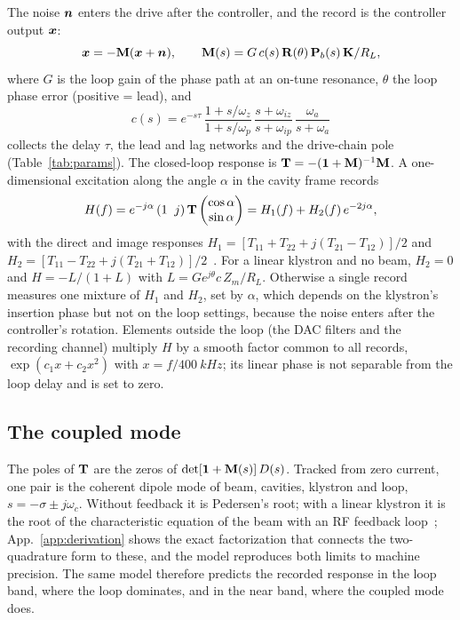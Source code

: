 The noise $\bm{n}$ enters the drive after the controller, and the record is the controller output $\bm{x}$:
\begin{equation}\label{eq:loop}
\bm{x}=-\mathbf{M}(\bm{x}+\bm{n}),\qquad \mathbf{M}(s)=G\,c(s)\,\mathbf{R}(\theta)\,\mathbf{P}_b(s)\,\mathbf{K}/R_L,
\end{equation}
where $G$ is the loop gain of the phase path at an on-tune resonance, $\theta$ the loop phase error (positive = lead), and
\begin{equation}\label{eq:chain}
c(s)=e^{-s\tau}\,\frac{1+s/\omega_z}{1+s/\omega_p}\,\frac{s+\omega_{iz}}{s+\omega_{ip}}\,\frac{\omega_a}{s+\omega_a}
\end{equation}
collects the delay $\tau$, the lead and lag networks and the drive-chain pole (Table~\ref{tab:params}). The closed-loop response is $\mathbf{T}=-(\mathbf{1}+\mathbf{M})^{-1}\mathbf{M}$. A one-dimensional excitation along the angle $\alpha$ in the cavity frame records
\begin{equation}\label{eq:recorded}
H(f)=e^{-j\alpha}\,(1\;\;j)\,\mathbf{T}\begin{pmatrix}\cos\alpha\\ \sin\alpha\end{pmatrix}=H_1(f)+H_2(f)\,e^{-2j\alpha},
\end{equation}
with the direct and image responses $H_1=[T_{11}+T_{22}+j(T_{21}-T_{12})]/2$ and $H_2=[T_{11}-T_{22}+j(T_{21}+T_{12})]/2$~\cite{Picinbono1995,Schreier2010}. For a linear klystron and no beam, $H_2=0$ and $H=-L/(1+L)$ with $L=Ge^{j\theta}c\,Z_m/R_L$. Otherwise a single record measures one mixture of $H_1$ and $H_2$, set by $\alpha$, which depends on the klystron's insertion phase but not on the loop settings, because the noise enters after the controller's rotation. Elements outside the loop (the DAC filters and the recording channel) multiply $H$ by a smooth factor common to all records, $\exp(c_1x+c_2x^2)$ with $x=f/\SI{400}{kHz}$; its linear phase is not separable from the loop delay and is set to zero.

\subsection{The coupled mode}

The poles of $\mathbf{T}$ are the zeros of $\det[\mathbf{1}+\mathbf{M}(s)]\,D(s)$. Tracked from zero current, one pair is the coherent dipole mode of beam, cavities, klystron and loop, $s=-\sigma\pm j\omega_c$. Without feedback it is Pedersen's root; with a linear klystron it is the root of the characteristic equation of the beam with an RF feedback loop~\cite{Boussard1985,Wilson1993}; App.~\ref{app:derivation} shows the exact factorization that connects the two-quadrature form to these, and the model reproduces both limits to machine precision. The same model therefore predicts the recorded response in the loop band, where the loop dominates, and in the near band, where the coupled mode does.

